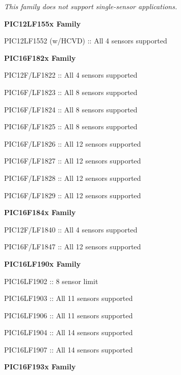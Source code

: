 \begin{DoxyItemize}
\begin{DoxyItemize}
\item {\itshape This family does not support single-\/sensor applications.} 
\end{DoxyItemize}\item {\bfseries P\+I\+C12\+L\+F155x Family} 
\begin{DoxyItemize}
\item P\+I\+C12\+L\+F1552 (w/\+H\+C\+V\+D) \+:\+: All 4 sensors supported 
\end{DoxyItemize}\item {\bfseries P\+I\+C16\+F182x Family} 
\begin{DoxyItemize}
\item P\+I\+C12\+F/\+L\+F1822 \+:\+: All 4 sensors supported 
\item P\+I\+C16\+F/\+L\+F1823 \+:\+: All 8 sensors supported 
\item P\+I\+C16\+F/\+L\+F1824 \+:\+: All 8 sensors supported 
\item P\+I\+C16\+F/\+L\+F1825 \+:\+: All 8 sensors supported 
\item P\+I\+C16\+F/\+L\+F1826 \+:\+: All 12 sensors supported 
\item P\+I\+C16\+F/\+L\+F1827 \+:\+: All 12 sensors supported 
\item P\+I\+C16\+F/\+L\+F1828 \+:\+: All 12 sensors supported 
\item P\+I\+C16\+F/\+L\+F1829 \+:\+: All 12 sensors supported 
\end{DoxyItemize}\item {\bfseries P\+I\+C16\+F184x Family} 
\begin{DoxyItemize}
\item P\+I\+C12\+F/\+L\+F1840 \+:\+: All 4 sensors supported 
\item P\+I\+C16\+F/\+L\+F1847 \+:\+: All 12 sensors supported 
\end{DoxyItemize}\item {\bfseries P\+I\+C16\+L\+F190x Family} 
\begin{DoxyItemize}
\item P\+I\+C16\+L\+F1902 \+:\+: 8 sensor limit 
\item P\+I\+C16\+L\+F1903 \+:\+: All 11 sensors supported 
\item P\+I\+C16\+L\+F1906 \+:\+: All 11 sensors supported 
\item P\+I\+C16\+L\+F1904 \+:\+: All 14 sensors supported 
\item P\+I\+C16\+L\+F1907 \+:\+: All 14 sensors supported 
\end{DoxyItemize}\item {\bfseries P\+I\+C16\+F193x Family} 

\end{DoxyItemize}
